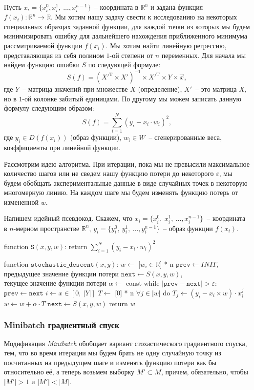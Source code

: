 \documentclass[12pt, a4paper, oneside, final]{article}
\begin{document}
	Пусть $x_{i} = \{x_i^0, x_i^1, ~ \ldots, x_i^{n - 1}\}$~-- координата в $\mathbb{R}^{n}$ и задана функция $f(x_i) : \mathbb{R}^{n} \to \mathbb{R}$. Мы хотим нашу задачу свести к исследованию на некоторых специальных образцах заданной функции, для каждой точки из которых мы будем минимизировать ошибку для дальнейшего нахождения приближенного минимума рассматриваемой функции $f(x_i)$. Мы хотим найти линейную регрессию, представляющая из себя полином $1$-ой степени от $n$ переменных. Для начала мы найдем функцию ошибки $S$ по следующей формуле:
	\[
		S(f) = (X'^{\mathrm{T}} \times X')^{-1} \times X'^{\mathrm{T}} \times Y \times \vec{x},
	\] где $Y$~-- матрица значений при множестве $X$ (определение), $X'$~-- это матрица $X$, но в $1$-ой колонке забитый единицами. По другому мы можем записать данную формулу следующим образом:
	\[
		S(f) = \sum\limits_{i = 1}^{N}{\left(y_{i} - x_{i} \cdot w_{i}\right)^{2}},
	\] где $y_{i} \in D(f(x_{i}))$ (образ функции), $w_{i} \in W$~-- сгенерированные веса, коэффициенты при линейной функции.

	Рассмотрим идею алгоритма. При итерации, пока мы не превысили максимальное количество шагов или не сведем нашу функцию потери до некоторого $\varepsilon$, мы будем обобщать экспериментальные данные в виде случайных точек в некоторую многомерную линию. На каждом шаге мы будем изменять функцию потерь от измененной $w$.

	Напишем идейный псевдокод. Скажем, что $x_{i} = \{x^{0}_{i}, ~ x^{1}_{i}, ~ \ldots, x^{n - 1}_{i}\}$~-- координата в $n$-мерном пространстве $\mathbb{R}^{n}$, $y_{i} = \{y^{0}_{i}, ~ y^{1}_{i}, ~ \ldots, y^{n - 1}_{i}\}$~-- образ функции $f(x_{i})$.
	\begin{mylisting}
function $\mathtt{S}(x, y, w)$:
	return $\sum\limits_{i = 1}^{N}{(y_{i} - x_{i} \cdot w_{i})^{2}}$

function $\mathtt{stochastic\_descent}(x, y)$:
	$w \gets$ [$w_{i} \in \mathbb{R}$] * n
	$\mathtt{prev} \gets INIT$, $\text{предыдущее значение функции потери}$
	$\mathtt{next} \gets S(x, y, w)$, $\text{текущее значение функции потери}$
	$\alpha \gets$ const
	while $|\mathtt{prev} - \mathtt{next}| > \varepsilon$:
		$\mathtt{prev} \gets \mathtt{next}$
		$i \gets x \in [0, ~ |Y|]$
		$T \gets$ [0] * n
		$\forall j \in |w|$ do
			$T_{j} \gets (y_{i} - x_{i} \times w) \cdot x_{i}^{j}$
		$w \gets w + \alpha \cdot T$
		$\mathtt{next} \gets S(x, y, w)$
	return $w$
	\end{mylisting}
	\subsubsection*{Minibatch градиентный спуск}
	Модификация \textit{Minibatch} обобщает вариант стохастического градиентного спуска, тем, что во время итерации мы будем брать не одну случайную точку из посчитанных на предыдущем шаге и изменять функцию потери как бы относительно её, а теперь возьмем выборку $M' \subset M$, причем, обязательно, чтобы $|M'| > 1$ и $|M'| < |M|$.
\end{document}
